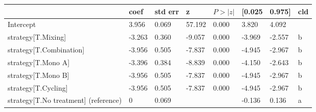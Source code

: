 \begin{tabular}{llllllll}
\toprule
 & coef & std err & z & $P>|z|$ & [0.025 & 0.975] & cld \\
\midrule
Intercept & 3.956 & 0.069 &    57.192 &  0.000 & 3.820 & 4.092 &  \\
strategy[T.Mixing] & -3.263 & 0.360 &    -9.057 &  0.000 & -3.969 & -2.557 & b \\
strategy[T.Combination] & -3.956 & 0.505 &    -7.837 &  0.000 & -4.945 & -2.967 & b \\
strategy[T.Mono A] & -3.396 & 0.384 &    -8.839 &  0.000 & -4.150 & -2.643 & b \\
strategy[T.Mono B] & -3.956 & 0.505 &    -7.837 &  0.000 & -4.945 & -2.967 & b \\
strategy[T.Cycling] & -3.956 & 0.505 &    -7.837 &  0.000 & -4.945 & -2.967 & b \\
strategy[T.No treatment] (reference) & 0 & 0.069 &  &  & -0.136 & 0.136 & a \\
\bottomrule
\end{tabular}
